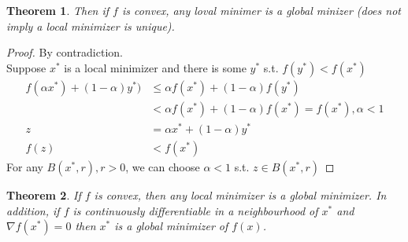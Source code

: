 \documentclass[12pt,letter]{article}
\newtheorem{theorem}{Theorem}[section]
\begin{document}
\begin{theorem}
  Then if $f$ is convex, any loval minimer is a global minizer (does not imply a local minimizer is unique).
\end{theorem}
\begin{proof}
  By contradiction.\\
  Suppose $x^*$ is a local minimizer and there is some $y^*$ s.t. $f(y^*)<f(x^*)$
  \begin{align*}
    f(\alpha x^*)+(1-\alpha)y^*) & \leq \alpha f(x^*)+(1-\alpha)f(y^*)\\
                                 & < \alpha f(x^*) + (1-\alpha)f(x^*)=f(x^*), \alpha < 1\\
    z &= \alpha x^* + (1-\alpha)y^*\\
    f(z) &< f(x^*)
  \end{align*}
  For any $B(x^*,r),r>0$, we can choose $\alpha<1$ s.t. $z\in B(x^*,r)$
\end{proof}

\begin{theorem}
  If $f$ is convex, then any local minimizer is a global minimizer. In addition, if $f$ is continuously differentiable in a neighbourhood of $x^*$ and $\nabla f(x^*)=0$ then $x^*$ is a global minimizer of $f(x)$.
\end{theorem}
\end{document}
